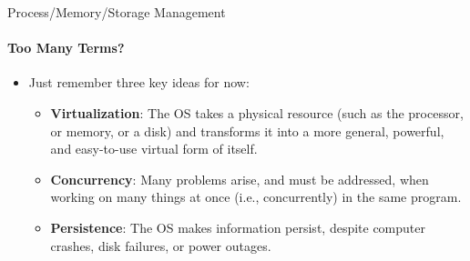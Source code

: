 \documentclass[10pt]{beamer}
\begin{document}
\begin{frame}{Process/Memory/Storage Management}
\framesubtitle{Too Many Terms?}
\begin{itemize}
\item Just remember three key ideas for now:
\begin{itemize}
\item \textbf{\alert{Virtualization}}: The OS takes a physical resource (such as the processor, or memory, or a disk) and transforms it into a more general, powerful, and easy-to-use virtual form of itself.
\item \textbf{\alert{Concurrency}}: Many problems arise, and must be addressed, when working on many things at once (i.e., concurrently) in the same program.
\item \textbf{\alert{Persistence}}: The OS makes information persist, despite computer crashes, disk failures, or power outages.
\end{itemize}
\end{itemize}
\end{frame}





\end{document}

